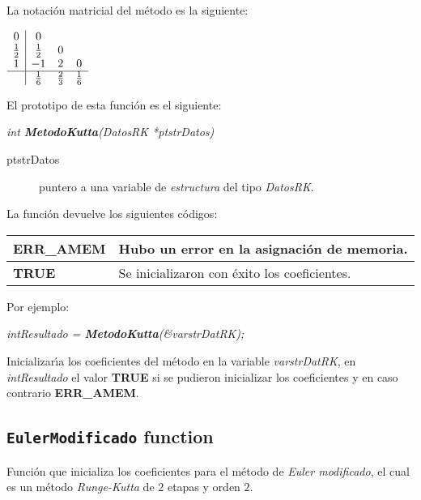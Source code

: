 La notaci\'on matricial del m\'etodo es la siguiente:

\begin{center}
$
\begin{array}{c|ccc}
0 & 0 \\
\frac{1}{2} & \frac{1}{2} & 0 \\
1 & -1 & 2 & 0 \\
\hline
 & \frac{1}{6} & \frac{2}{3} & \frac{1}{6}
\end{array}
$
\end{center}

El prototipo de esta funci\'on es el siguiente:

\begin{center}
\emph{int \textbf{MetodoKutta}(DatosRK *ptstrDatos)}
\end{center}

\begin{description}
\item[ptstrDatos] puntero a una variable de \emph{estructura} del tipo
\emph{DatosRK}.
\end{description}

La funci\'on devuelve los siguientes c\'odigos:

\begin{center}
\begin{tabular}{|l|l|}
\hline
\textbf{ERR\_AMEM} & Hubo un error en la asignaci\'on de memoria. \\
\hline
\textbf{TRUE} & Se inicializaron con \'exito los coeficientes. \\
\hline
\end{tabular}
\end{center}

Por ejemplo:

\begin{center}
\emph{intResultado = \textbf{MetodoKutta}(\&varstrDatRK);}
\end{center}

Inicializar\'{\i}a los coeficientes del m\'etodo en la variable
\emph{varstrDatRK}, en \emph{intResultado} el valor \textbf{TRUE} si se pudieron
inicializar los coeficientes y en caso contrario \textbf{ERR\_AMEM}.

\subsection{\texttt{EulerModificado} function}

Funci\'on que inicializa los coeficientes para el m\'etodo de \emph{Euler 
modificado}, el cual es un m\'etodo \emph{Runge-Kutta} de $2$ etapas y 
orden $2$.\newline

